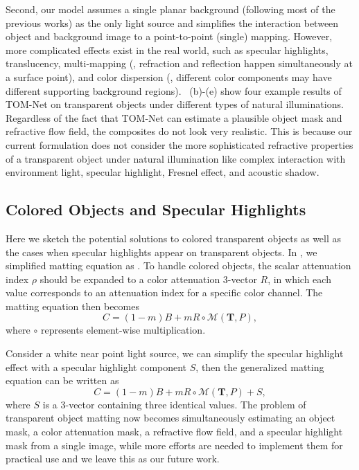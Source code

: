 Second, our model assumes a single planar background (following most of the previous works) as the only light source and simplifies the interaction between object and background image to a point-to-point (single) mapping. However, more complicated effects exist in the real world, such as specular highlights, translucency, multi-mapping (\ie, refraction and reflection happen simultaneously at a surface point), and color dispersion (\ie, different color components may have different supporting background regions). 
~(b)-(e) show four example results of TOM-Net on transparent objects under different types of natural illuminations. Regardless of the fact that TOM-Net can estimate a plausible object mask and refractive flow field, the composites do not look very realistic. 
This is because our current formulation does not consider the more sophisticated refractive properties of a transparent object under natural illumination like complex interaction with environment light, specular highlight, Fresnel effect, and acoustic shadow.

\subsection{Colored Objects and Specular Highlights}
Here we sketch the potential solutions to colored transparent objects as well as the cases when specular highlights appear on transparent objects. In , we simplified matting equation as .
To handle colored objects, the scalar attenuation index $\rho$ should be expanded to a color attenuation 3-vector $R$, in which each value corresponds to an attenuation index for a specific color channel. The matting equation then becomes 
\begin{equation}
    \label{eq:color_2}
    C = (1 - m) B + mR \circ \mathcal{M}(\mathbf{T}, P),
\end{equation}
where $\circ$ represents element-wise multiplication.

Consider a white near point light source, we can simplify the specular highlight effect with a specular highlight component $S$, then the generalized matting equation can be written as
\begin{equation}
    \label{eq:color_2}
    C = (1 - m) B + mR \circ \mathcal{M}(\mathbf{T}, P) + S,
\end{equation}
where $S$ is a 3-vector containing three identical values.
The problem of transparent object matting now becomes simultaneously estimating an object mask, a color attenuation mask, a refractive flow field, and a specular highlight mask from a single image, while more efforts are needed to implement them for practical use and we leave this as our future work.

